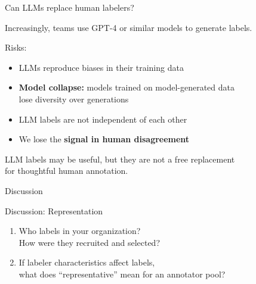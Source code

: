\documentclass[aspectratio=169,11pt]{beamer}
\begin{document}
\begin{frame}{Can LLMs replace human labelers?}

Increasingly, teams use GPT-4 or similar models to generate labels.

\vspace{1em}

Risks:
\begin{itemize}
  \item LLMs reproduce biases in their training data
  \item \textbf{Model collapse:} models trained on model-generated data\\
        lose diversity over generations \citep{shumailov2023curse}
  \item LLM labels are not independent of each other
  \item We lose the \textbf{signal in human disagreement}
\end{itemize}

\vspace{1em}

LLM labels may be useful, but they are not a free replacement\\
for thoughtful human annotation.
\end{frame}

\begin{frame}[standout]
Discussion
\end{frame}

\begin{frame}{Discussion: Representation}

\begin{enumerate}
  \item Who labels in your organization?\\
        How were they recruited and selected?

  \vspace{1em}

  \item If labeler characteristics affect labels,\\
        what does ``representative'' mean for an annotator pool?
\end{enumerate}
\end{frame}

\end{document}
